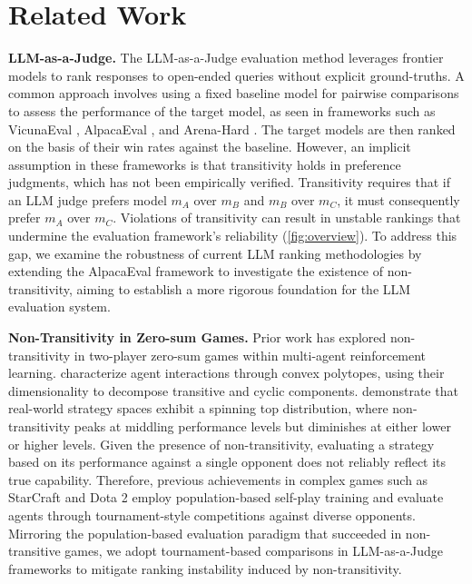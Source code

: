 \section{Related Work}
\textbf{LLM-as-a-Judge.}
The LLM-as-a-Judge \cite{zheng2023judgingllmasajudgemtbenchchatbot} evaluation method leverages frontier models to rank responses to open-ended queries without explicit ground-truths. A common approach involves using a fixed baseline model for pairwise comparisons to assess the performance of the target model, as seen in frameworks such as VicunaEval \cite{vicuna2023}, AlpacaEval \cite{alpaca_eval}, and Arena-Hard \cite{li2024crowdsourceddatahighqualitybenchmarks}. The target models are then ranked on the basis of their win rates against the baseline. However, an implicit assumption in these frameworks is that transitivity holds in preference judgments, which has not been empirically verified. Transitivity requires that if an LLM judge prefers model $m_A$ over $m_B$ and $m_B$ over $m_C$, it must consequently prefer $m_A$ over $m_C$. Violations of transitivity can result in unstable rankings that undermine the evaluation framework's reliability (\cref{fig:overview}). To address this gap, we examine the robustness of current LLM ranking methodologies by extending the AlpacaEval framework to investigate the existence of non-transitivity, aiming to establish a more rigorous foundation for the LLM evaluation system.

\textbf{Non-Transitivity in Zero-sum Games.} Prior work has explored non-transitivity in two-player zero-sum games within multi-agent reinforcement learning. \citet{balduzzi2019openendedlearningsymmetriczerosum} characterize agent interactions through convex polytopes, using their dimensionality to decompose transitive and cyclic components. \citet{NEURIPS2020_ca172e96} demonstrate that real-world strategy spaces exhibit a spinning top distribution, where non-transitivity peaks at middling performance levels but diminishes at either lower or higher levels. Given the presence of non-transitivity, evaluating a strategy based on its performance against a single opponent does not reliably reflect its true capability. Therefore, previous achievements in complex games such as StarCraft \cite{2019alphastar} and Dota 2 \cite{openai2019dota2largescale} employ population-based self-play training and evaluate agents through tournament-style competitions against diverse opponents. Mirroring the population-based evaluation paradigm that succeeded in non-transitive games, we adopt tournament-based comparisons in LLM-as-a-Judge frameworks to mitigate ranking instability induced by non-transitivity.